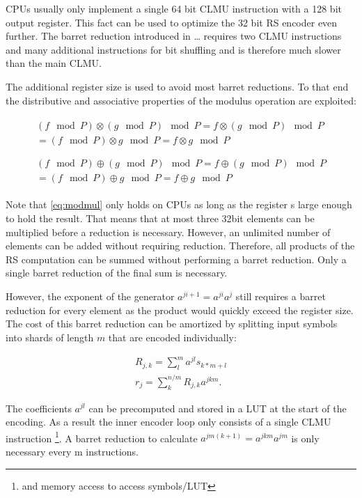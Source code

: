 \documentclass[
]{article}
\begin{document}
CPUs usually only implement a single 64 bit CLMU instruction with a 128
bit output register. This fact can be used to optimize the 32 bit RS
encoder even further. The barret reduction introduced in \ldots{}
requires two CLMU instructions and many additional instructions for bit
shuffling and is therefore much slower than the main CLMU.

The additional register size is used to avoid most barret reductions. To
that end the distributive and associative properties of the modulus
operation are exploited:

\begin{gather}
\begin{gathered}
(f \mod P) \otimes (g \mod P) \mod P = f \otimes (g \mod P) \mod P\\
= (f \mod P) \otimes g \mod P = f \otimes g \mod P\\
\end{gathered}\label{eq:modmul}\\
\begin{gathered}
(f \mod P) \oplus (g  \mod P) \mod P = f \oplus (g \mod P) \mod P\\
 = (f \mod P) \oplus g \mod P = f \oplus g \mod P\label{eq:modsum}
\end{gathered}
\end{gather}

Note that \eqref{eq:modmul} only holds on CPUs as long as the register s large enough
to hold the result. That means that at most three 32bit elements can be
multiplied before a reduction is necessary. However, an unlimited number
of elements can be added without requiring reduction. Therefore, all
products of the RS computation can be summed without performing a barret
reduction. Only a single barret reduction of the final sum is necessary.

However, the exponent of the generator \(a^{ji + 1} = a^{ji} a^j\) still
requires a barret reduction for every element as the product would
quickly exceed the register size. The cost of this barret reduction can
be amortized by splitting input symbols into shards of
length \(m\) that are encoded individually:

\begin{gather}
R_{j,k} = \sum_l^m a^{jl} s_{k*m+l}\\
r_j = \sum_k^{n/m} R_{j,k} a^{jkm}.
\end{gather}

The coefficients \(a^{jl}\) can be precomputed and stored in a LUT at
the start of the encoding. As a result the inner encoder loop only
consists of a single CLMU instruction
\footnote{and memory access to access symbols/LUT}. A barret reduction
to calculate \(a^{jm(k + 1)} = a^{jkm} a^{jm}\) is only necessary every
m instructions.
\end{document}
